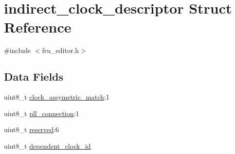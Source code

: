 \hypertarget{structindirect__clock__descriptor}{\section{indirect\-\_\-clock\-\_\-descriptor Struct Reference}
\label{structindirect__clock__descriptor}
}


{\ttfamily \#include $<$fru\-\_\-editor.\-h$>$}

\subsection*{Data Fields}
\begin{DoxyCompactItemize}
\item 
uint8\-\_\-t \hyperlink{structindirect__clock__descriptor_a1c1b58aa16e331f02e1a5b73e70fd56a}{clock\-\_\-assymetric\-\_\-match}\-:1
\item 
uint8\-\_\-t \hyperlink{structindirect__clock__descriptor_a97990e59483e54669fe4b852593c3823}{pll\-\_\-connection}\-:1
\item 
uint8\-\_\-t \hyperlink{structindirect__clock__descriptor_a0328cc660ee6c195839c685fe5bf3635}{reserved}\-:6
\item 
uint8\-\_\-t \hyperlink{structindirect__clock__descriptor_a886edf185546e65d058d2ae4783ccc32}{dependent\-\_\-clock\-\_\-id}
\end{DoxyCompactItemize}



